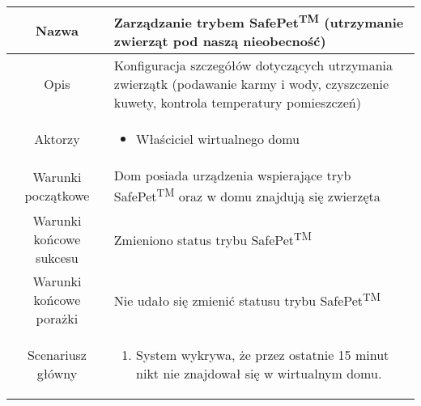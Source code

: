 \documentclass{article}
\begin{document}
\begin{enumerate}
\begin{enumerate}
				\begin{table}[H]
					\centering
					\begin{tabular}{|c|p{7cm}|}
						\hline
						Nazwa                   & Zarządzanie trybem SafePet\textsuperscript{TM} (utrzymanie zwierząt pod naszą nieobecność)                                                                                                                                                                                                                                                        \\
						\hline
						Opis                    & Konfiguracja szczegółów dotyczących utrzymania zwierzątk (podawanie karmy i wody, czyszczenie kuwety, kontrola temperatury pomieszczeń)                                                                                                                                                                                                           \\
						\hline
						Aktorzy                 & \begin{itemize}\item Właściciel wirtualnego domu\end{itemize}                                                                                                                                                                                                                                                                                     \\
						\hline
						Warunki początkowe      & Dom posiada urządzenia wspierające tryb SafePet\textsuperscript{TM} oraz w domu znajdują się zwierzęta                                                                                                                                                                                                                                            \\
						\hline
						Warunki końcowe sukcesu & Zmieniono status trybu SafePet\textsuperscript{TM}                                                                                                                                                                                                                                                                                                \\
						\hline
						Warunki końcowe porażki & Nie udało się zmienić statusu trybu SafePet\textsuperscript{TM}                                                                                                                                                                                                                                                                                   \\
						\hline
						Scenariusz główny       & \begin{enumerate}\item System wykrywa, że przez ostatnie 15 minut nikt nie znajdował się w wirtualnym domu.


\end{enumerate}
\end{tabular}
\end{table}
\end{enumerate}
\end{enumerate}
\end{document}

